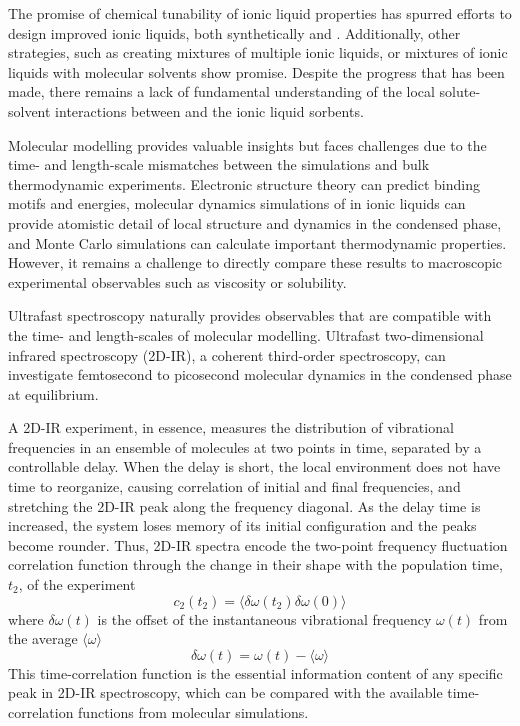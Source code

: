 The promise of chemical tunability of ionic liquid properties has spurred efforts to design improved ionic liquids, both synthetically\cite{batesJACS-02,ramdinIECR-12,Wang2011,Wang2010a,Zhang2009,Gurkan2010,seoJPCB-14} and .\cite{Paduszynski2014,Yan2014}  Additionally, other strategies, such as creating mixtures of multiple ionic liquids,\cite{Chatel2014,Maximo2014} or mixtures of ionic liquids with molecular solvents\cite{Romanos2013,Camper2008} show promise. Despite the progress that has been made, there remains a lack of fundamental understanding of the local solute-solvent interactions between  and the ionic liquid sorbents.

Molecular modelling provides valuable insights but faces challenges due to the time- and length-scale mismatches between the simulations and bulk thermodynamic experiments.
Electronic structure theory can  predict  binding motifs and energies,\cite{Yu2006,Bhargava2007,Gonzalez-Miquel2012,Steckel2012} molecular dynamics simulations of  in ionic liquids can provide atomistic detail of local structure and dynamics in the condensed phase,\cite{Huang2005,Kerle2009,palomarIECR-11,wendlerJCTC-12,holloczkiCPC-13,Shim2010} and Monte Carlo simulations can calculate important thermodynamic properties.\cite{Shi2010,Shi2014,Shah2002,Kerle2009,Kerle2013,Ghobadi2011} However, it remains a challenge to directly compare these results to macroscopic experimental observables such as viscosity or  solubility.

Ultrafast spectroscopy naturally provides observables that are compatible with the time- and length-scales of molecular modelling. Ultrafast two-dimensional infrared spectroscopy (2D-IR), a coherent third-order spectroscopy, can investigate femtosecond to picosecond molecular dynamics in the condensed phase at equilibrium.\cite{khalilJPCA-03,choCR-08b,hammzanni-11,Zheng2005}

A 2D-IR experiment, in essence, measures the distribution of vibrational frequencies in an ensemble of molecules at two points in time, separated by a controllable delay. When the delay is short, the local environment does not have time to reorganize, causing correlation of initial and final frequencies, and stretching the 2D-IR peak along the frequency diagonal. As the delay time is increased, the system loses memory of its initial configuration and the peaks become rounder. Thus, 2D-IR spectra encode the two-point frequency fluctuation correlation function through the change in their shape with the population time, $t_2$, of the experiment 
\begin{equation}
\label{eq:FFCF}
c_2(t_2) = \langle\delta\omega(t_2)\delta\omega(0)\rangle
\end{equation} 
where $\delta\omega(t)$ is the offset of the instantaneous vibrational frequency $\omega(t)$ from the average $\langle\omega\rangle$
\begin{equation}
\delta\omega(t) = \omega(t) - \langle\omega\rangle
\end{equation}
This time-correlation function is the essential information content of any specific peak in 2D-IR spectroscopy, which can be compared with the available time-correlation functions from molecular simulations.

